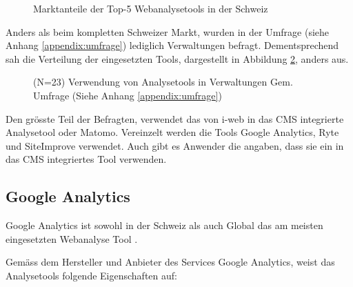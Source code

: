 \begin{figure}[h]
  \centering
{}
\caption{Marktanteile der Top-5 Webanalysetools in der Schweiz \parencite{datanyzeSwitzerlandWebanalytics}}
\label{fig:marktanteil}
\end{figure}


Anders als beim kompletten Schweizer Markt, wurden in der Umfrage (siehe Anhang \ref{appendix:umfrage}) lediglich Verwaltungen befragt. Dementsprechend sah die Verteilung der eingesetzten Tools, dargestellt in Abbildung \ref{fig:verwVerteilungTools}, anders aus.

\begin{figure}[h]
  \centering
{}
\caption{(N=23) Verwendung von Analysetools in Verwaltungen Gem. Umfrage (Siehe Anhang \ref{appendix:umfrage})}
\label{fig:verwVerteilungTools}
\end{figure}

Den grösste Teil der Befragten, verwendet das von i-web in das CMS integrierte Analysetool oder Matomo. Vereinzelt werden die Tools Google Analytics, Ryte und SiteImprove verwendet. Auch gibt es Anwender die angaben, dass sie ein in das CMS integriertes Tool verwenden. 


\subsection{Google Analytics}\label{subsec:GoogleAnalytics}
Google Analytics ist sowohl in der Schweiz als auch Global das am meisten eingesetzten Webanalyse Tool \parencite{datanyzeSwitzerlandWebanalytics}. 

Gemäss dem Hersteller und Anbieter des Services Google Analytics, weist das Analysetools folgende Eigenschaften auf:

